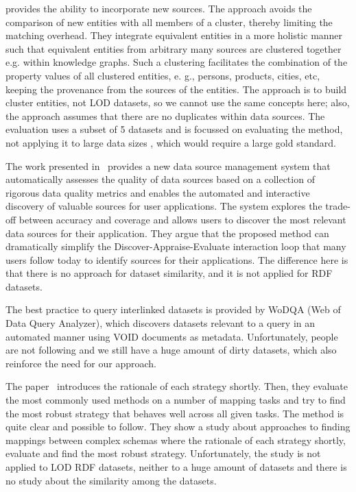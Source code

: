 \documentclass[sw]{iosart2x}
\begin{document}
\cite{nentwig2018incremental} provides the ability to incorporate new sources.
The approach avoids the comparison of new entities with all members of a cluster, thereby limiting the matching overhead.
They integrate equivalent entities in a more holistic manner such that equivalent entities from arbitrary many sources are clustered together e.g. within knowledge graphs.
Such a clustering facilitates the combination of the property values of all clustered entities, e. g., persons, products, cities, etc, keeping the provenance from the sources of the entities.
The approach is to build cluster entities, not LOD datasets, so we cannot use the same concepts here; also, the approach assumes that there are no duplicates within data sources.
The evaluation uses a subset of 5 datasets and is focussed on evaluating the method, not applying it to large data sizes , which would require a large gold standard.

The work presented in~\cite{rekatsinas2015finding} provides a new data source management system that automatically assesses the quality of data sources based on a collection of rigorous data quality metrics and enables the automated and interactive discovery of valuable sources for user applications.
The system explores the trade-off between accuracy and coverage and allows users to discover the most relevant data sources for their application.
They argue that the proposed method can dramatically simplify the Discover-Appraise-Evaluate interaction loop that many users follow today to identify sources for their applications.
The difference here is that there is no approach for dataset similarity, and it is not applied for RDF datasets.

The best practice to query interlinked datasets is provided by WoDQA (Web of Data Query Analyzer)\cite{akar2012querying}, which discovers datasets relevant to a query in an automated manner using VOID documents as metadata.
Unfortunately, people are not following and we still have a huge amount of dirty datasets, which also reinforce the need for our approach.

The paper~\cite{peukert2010comparing} introduces the rationale of each strategy shortly.
Then, they evaluate the most commonly used methods on a number of mapping tasks and try to find the most robust strategy that behaves well across all given tasks.
The method is quite clear and possible to follow.
They show a study about approaches to finding mappings between complex schemas where the rationale of each strategy shortly, evaluate and find the most robust strategy.
Unfortunately, the study is not applied to LOD RDF datasets, neither to a huge amount of datasets and there is no study about the similarity among the datasets.
\end{document}
